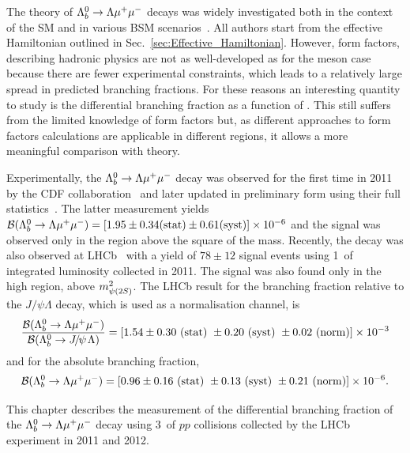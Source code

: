The theory of ${{\Lambda}^0_{b}}\rightarrow{\ensuremath{\Lambda}}{\ensuremath{\mu^+\mu^-}}$ decays was widely investigated both in the context of the SM and in various
BSM scenarios~\cite{Aslam:2008hp,Wang:2008sm,Huang:1998ek,Chen:2001ki,Chen:2001zc,Chen:2001sj,
Zolfagharpour:2007eh,Mott:2011cx,Aliev:2010uy,Mohanta:2010eb,Sahoo:2011yb}.
All authors start from the effective Hamiltonian outlined in Sec.~\ref{sec:Effective_Hamiltonian}. 
However, form factors, describing hadronic physics are not as well-developed as for the meson case 
because there are fewer experimental constraints, which leads to a relatively
large spread in predicted branching fractions. For these reasons an interesting quantity to study is the differential 
branching fraction as a function of \qsq. This still suffers from the limited knowledge of form factors but, as different 
approaches to form factors calculations are applicable in different \qsq regions, it allows a more meaningful comparison with theory.

Experimentally, the ${{\Lambda}^0_{b}}\rightarrow{\ensuremath{\Lambda}}{\ensuremath{\mu^+\mu^-}}$ decay was observed for the first time in 2011 by the CDF 
collaboration~\cite{Aaltonen:2011qs} 
and later updated in preliminary form using their full statistics~\cite{Behari:2013xc}. 
The latter measurement yields $\mathcal{B}({{\Lambda}^0_{b}}\rightarrow{\ensuremath{\Lambda}}{\ensuremath{\mu^+\mu^-}}) =[1.95\pm0.34(\mathrm{stat})\pm0.61(\mathrm{syst})]\times 10^{-6}$ and the signal was observed only in the \qsq region above the square of the \psitwos mass.
Recently, the decay was also observed at LHCb~\cite{LHCb-PAPER-2013-025} with a yield of $78\pm12$ signal events
using 1~\invfb of integrated luminosity collected in 2011. The signal was also found only in the high \qsq region, above $m^2_{\psitwos}$.
The LHCb result for the branching fraction relative to the $J/\psi\Lambda$ decay, which is used as a normalisation channel, is 
%
\begin{equation*}
\frac{\mathcal{B}(\Lb\to\Lz\mumu)}{\mathcal{B}(\Lb\to\jpsi\Lz)}=[1.54 \pm 0.30 ~(\mathrm{stat})~ \pm 0.20 ~(\mathrm{syst})~ \pm 0.02 ~(\mathrm{norm})]\times 10^{-3} 
\end{equation*}
and for the absolute branching fraction,
\begin{equation*}
\mathcal{B}({{\Lambda}^0_{b}}\rightarrow{\ensuremath{\Lambda}}{\ensuremath{\mu^+\mu^-}}) =[0.96 \pm 0.16 ~(\mathrm{stat})~ \pm 0.13 ~(\mathrm{syst})~ \pm 0.21 ~(\mathrm{norm})]\times 10^{-6}.
\end{equation*}

This chapter describes the measurement of the differential branching fraction
of the ${{\Lambda}^0_{b}}\rightarrow{\ensuremath{\Lambda}}{\ensuremath{\mu^+\mu^-}}$ decay using 3~\invfb of $pp$ collisions collected by the LHCb experiment in 2011 and 2012.

